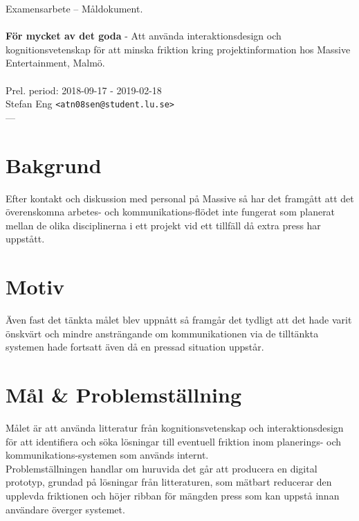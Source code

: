 \documentclass{article}
\begin{document}
\begin{center}

  Examensarbete -- Måldokument. \\
  \ \\
  {\large
    \textbf{För mycket av det goda} -
    Att använda interaktionsdesign och kognitionsvetenskap för
    att minska friktion kring projektinformation hos Massive
    Entertainment, Malmö. \\
  }
  \ \\
  Prel. period: 2018-09-17 - 2019-02-18\\
  Stefan Eng \texttt{<atn08sen@student.lu.se>}
  \ \\
  ---
  \vspace{-0.3cm}

\end{center}

\section*{Bakgrund}

  Efter kontakt och diskussion med personal på Massive så har det framgått att
  det överenskomna arbetes- och kommunikations-flödet inte fungerat som
  planerat mellan de olika disciplinerna i ett projekt vid ett tillfäll då
  extra press har uppstått.

\section*{Motiv}

  Även fast det tänkta målet blev uppnått så framgår det tydligt att det hade
  varit önskvärt och mindre ansträngande om kommunikationen via de
  tilltänkta systemen hade fortsatt även då en pressad situation uppstår.

\section*{Mål \& Problemställning}

  Målet är att använda litteratur från kognitionsvetenskap och interaktionsdesign
  för att identifiera och söka lösningar till eventuell friktion inom
  planerings- och kommunikations-systemen som används internt. \\

  Problemställningen handlar om huruvida det går att producera en
  digital prototyp, grundad på lösningar från litteraturen, som mätbart
  reducerar den upplevda friktionen och höjer ribban för mängden press som kan
  uppstå innan användare överger systemet.
\end{document}
